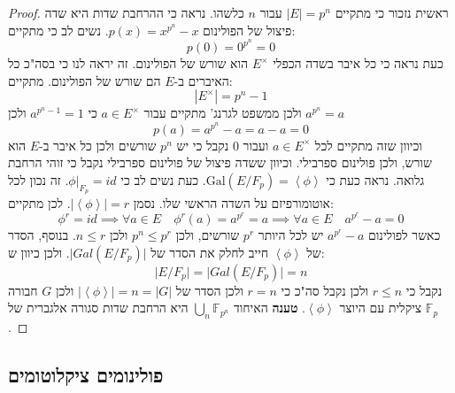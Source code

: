 \documentclass{tstextbook}
\begin{document}
\begin{proof}
ראשית נזכור כי מתקיים \(\lvert E \rvert=p^n\) עבור \(n\) כלשהו. נראה כי ההרחבת שדות היא שדה פיצול של הפולינום \(p(x)=x^{p^{n}}-x\). נשים לב כי מתקיים:
$$p(0)=0^{p^n}=0$$
כעת נראה כי כל איבר בשדה הכפלי \(E^{\times}\) הוא שורש של הפולינום. זה יראה לנו כי בסה"כ כל האיברים ב-\(E\) הם שורש של הפולינום. מתקיים:
$$\left\lvert  E^\times  \right\rvert =p^{n}-1$$
ולכן ממשפט לגרנג' מתקיים עבור \(a \in E^\times\) כי \(a^{p^{n}-1}=1\) ולכן \(a^{p^{n}}=a\)$$p(a)=a^{p^{n}}-a=a-a=0$$
וכיוון שזה מתקיים לכל \(a\in E^{\times}\) ועבור 0 נקבל כי יש \(p^{n}\) שורשים ולכן כל איבר ב-\(E\) הוא שורש, ולכן פולינום ספרבילי. וכיוון ששדה פיצול של פולינום ספרבילי נקבל כי זוהי הרחבת גלואה. 
נראה כעת כי \(\mathrm{Gal}(E / F_{p})=\left\langle  \phi  \right\rangle\). כעת נשים לב כי \(\phi|_{F_{p}}=id\). זה נכון לכל אוטומורפיזם על השדה הראשי שלו. נסמן \(\left\lvert  \left\langle  \phi  \right\rangle  \right\rvert=r\). לכן מתקיים:
$$\phi^r = id \implies \forall a \in E\quad \phi^{r}(a)=a^{p^{r}}=a\implies \forall a \in E\quad a^{p^{r}}-a=0$$
כאשר לפולינום \(a^{p^{r}}-a\) יש לכל היותר \(p^{r}\) שורשים, ולכן \(p^{n}\leq p^{r}\) ולכן \(n\leq r\). בנוסף, הסדר של \(\left\langle  \phi  \right\rangle\) חייב לחלק את הסדר של \(\lvert Gal(E / F_{p}) \rvert\). ולכן כיוון ש:
$$\lvert E / F_{p} \rvert=\lvert Gal(E / F_{p}) \rvert=n$$
נקבל כי \(r\leq n\) ולכן נקבל סה"כ כי \(r=n\) ולכן הסדר של \(\left\lvert  \left\langle  \phi  \right\rangle  \right\rvert=n=\lvert G \rvert\) ולכן \(G\) חבורה ציקלית עם היוצר \(\left\langle  \phi  \right\rangle\).
\textbf{טענה}
האיחוד \(\bigcup_{n}\mathbb{F}_{p^{n}}\) היא הרחבת שדות סגורה אלגברית של \(\mathbb{F} _p\).

\end{proof}
\subsection{פולינומים ציקלוטומים}
\end{document}

